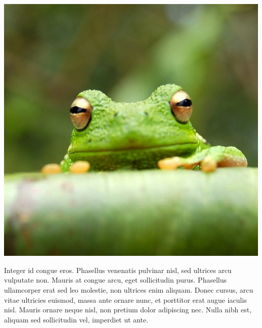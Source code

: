 \documentclass[10pt,a4paper]{article} %
\begin{document}
\begin{multicols}{3}
    \begin{center}
        \includegraphics[width=0.8\linewidth]{frog.jpg}
    \end{center}

    Integer id congue eros. Phasellus venenatis pulvinar nisl, sed ultrices arcu
    vulputate non. Mauris at congue arcu, eget sollicitudin purus. Phasellus
    ullamcorper erat sed leo molestie, non ultrices enim aliquam. Donec cursus,
    arcu vitae ultricies euismod, massa ante ornare nunc, et porttitor erat augue
    iaculis nisl. Mauris ornare neque nisl, non pretium dolor adipiscing nec. Nulla
    nibh est, aliquam sed sollicitudin vel, imperdiet ut ante.

\end{multicols}

\end{document}

